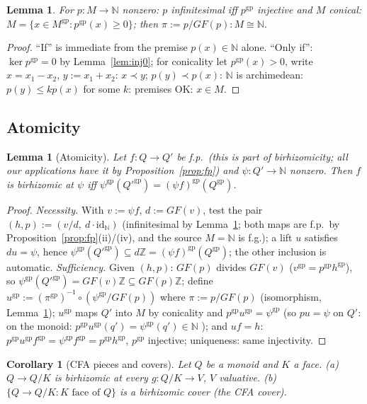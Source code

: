 \documentclass[11pt]{article}
\newtheorem{lemma}[theorem]{Lemma}
\newtheorem{corollary}[theorem]{Corollary}
\theoremstyle{definition}
\newcommand{\gp}{\mathrm{gp}}
\newcommand{\Z}{\mathbb{Z}}
\begin{document}
\begin{lemma}\label{lem:infstruct}
For $p:M\to\mathbb N$ nonzero: $p$ infinitesimal iff $p^{\gp}$
injective and $M$ conical: $M=\{x\in M^{\gp}:p^{\gp}(x)\ge0\}$; then
$\pi:=p/{GF}(p):M\cong\mathbb N$.
\end{lemma}

\begin{proof}
``If'' is immediate from the premise $p(x)\in\mathbb N$ alone. ``Only
if'': $\ker p^{\gp}=0$ by Lemma~\ref{lem:inj0}; for conicality let
$p^{\gp}(x)>0$, write $x=x_1-x_2$, $y:=x_1+x_2$: $x\prec y$;
$p(y)\prec p(x)$: $\mathbb N$ is archimedean: $p(y)\le kp(x)$ for
some $k$: premises OK: $x\in M$.
\end{proof}

\subsection{Atomicity}

\begin{lemma}[Atomicity]\label{lem:atomic}
Let $f:Q\to Q'$ be f.p.\ \textup{(}this is part of birhizomicity;
all our applications have it by
Proposition~\ref{prop:fp}\textup{)} and
$\psi:Q'\to\mathbb N$ nonzero. Then $f$
is birhizomic at $\psi$ iff
$\psi^{\gp}(Q'^{\gp})=(\psi f)^{\gp}(Q^{\gp})$.
\end{lemma}

\begin{proof}
\emph{Necessity.} With $v:=\psi f$, $d:={GF}(v)$, test the pair
$(h,p):=(v/d,\ d\cdot\mathrm{id}_{\mathbb N})$
\textup{(}infinitesimal by Lemma~\ref{lem:infstruct}; both maps
are f.p.\ by Proposition~\ref{prop:fp}(ii)/(iv), and the source
$M=\mathbb N$ is f.g.\textup{)}; a lift $u$ satisfies $du=\psi$, hence
$\psi^{\gp}(Q'^{\gp})\subseteq d\Z=(\psi f)^{\gp}(Q^{\gp})$; the
other inclusion is automatic.
\emph{Sufficiency.} Given $(h,p)$: ${GF}(p)$ divides ${GF}(v)$
($v^{\gp}=p^{\gp}h^{\gp}$), so $\psi^{\gp}(Q'^{\gp})
={GF}(v)\Z\subseteq{GF}(p)\Z$; define
$u^{\gp}:=(\pi^{\gp})^{-1}\circ(\psi^{\gp}/{GF}(p))$ where
$\pi:=p/{GF}(p)$ (isomorphism, Lemma~\ref{lem:infstruct});
$u^{\gp}$ maps $Q'$ into $M$ by conicality and
$p^{\gp}u^{\gp}=\psi^{\gp}$ (so $pu=\psi$ on $Q'$: on the monoid:
$p^{\gp}u^{\gp}(q')=\psi^{\gp}(q')\in\mathbb N$ \checkmark); and
$uf=h$: $p^{\gp}u^{\gp}f^{\gp}=\psi^{\gp}f^{\gp}=p^{\gp}h^{\gp}$,
$p^{\gp}$ injective; uniqueness: same injectivity.
\end{proof}

\begin{corollary}[CFA pieces and covers]\label{cor:cfa}
Let $Q$ be a monoid and $K$ a face.
\textup{(}a\textup{)} $Q\to Q/K$ is birhizomic at every
$g:Q/K\to V$, $V$ valuative.
\textup{(}b\textup{)} $\{Q\to Q/K:K\text{ face of }Q\}$ is a
birhizomic cover \textup{(}the \emph{CFA cover}\textup{)}.
\end{corollary}
\end{document}
